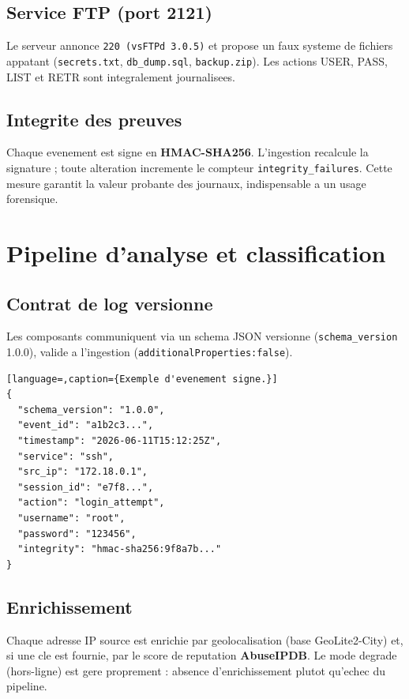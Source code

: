 \documentclass[11pt,a4paper]{article}
\begin{document}
\subsection{Service FTP (port 2121)}
Le serveur annonce \texttt{220 (vsFTPd 3.0.5)} et propose un faux systeme de fichiers
appatant (\texttt{secrets.txt}, \texttt{db\_dump.sql}, \texttt{backup.zip}). Les actions
USER, PASS, LIST et RETR sont integralement journalisees.

\subsection{Integrite des preuves}
Chaque evenement est signe en \textbf{HMAC-SHA256}. L'ingestion recalcule la signature ;
toute alteration incremente le compteur \texttt{integrity\_failures}. Cette mesure
garantit la valeur probante des journaux, indispensable a un usage forensique.

\section{Pipeline d'analyse et classification}
\subsection{Contrat de log versionne}
Les composants communiquent via un schema JSON versionne (\texttt{schema\_version}
1.0.0), valide a l'ingestion (\texttt{additionalProperties:false}).

\begin{lstlisting}[language=,caption={Exemple d'evenement signe.}]
{
  "schema_version": "1.0.0",
  "event_id": "a1b2c3...",
  "timestamp": "2026-06-11T15:12:25Z",
  "service": "ssh",
  "src_ip": "172.18.0.1",
  "session_id": "e7f8...",
  "action": "login_attempt",
  "username": "root",
  "password": "123456",
  "integrity": "hmac-sha256:9f8a7b..."
}
\end{lstlisting}

\subsection{Enrichissement}
Chaque adresse IP source est enrichie par geolocalisation (base GeoLite2-City) et, si une
cle est fournie, par le score de reputation \textbf{AbuseIPDB}. Le mode degrade
(hors-ligne) est gere proprement : absence d'enrichissement plutot qu'echec du pipeline.
\end{document}
